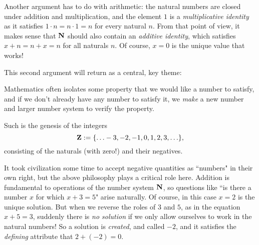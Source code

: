 \documentclass[11pt,oneside]{amsart}
\begin{document}
Another argument has to do with arithmetic: the natural numbers are closed under 
addition and multiplication, and the element $1$ is a 
{\em multiplicative identity} as it satisfies $1\cdot n=n\cdot 1=n$ for every 
natural $n$.  From that point of view, it makes sense that $\mathbf{N}$ should also 
contain an {\em additive identity}, which satisfies $x + n = n + x = n$ for 
all naturals $n$.  Of course, $x=0$ is the unique value that works!

This second argument will return as a central, key theme: 
\begin{philosophy}
	Mathematics often isolates some property that we would like a number to 
  satisfy, and if we don't already have any number to satisfy it, we {\em make} 
  a new number and larger number system to verify the property. 
\end{philosophy}

Such is the genesis of the integers
\[\mathbf{Z}:=\{\ldots -3,-2,-1,0,1,2,3,\ldots\},\]
consisting of the naturals (with zero!) and their negatives.

It took civilization some time to accept negative quantities as ``numbers" in 
their own right, but the above philosophy plays a critical role here.  
Addition is fundamental to operations of the number system $\mathbf{N}$,
so questions like ``is there a number $x$ for which $x+3=5$" arise naturally.  
Of course, in this case $x=2$ is the unique solution.
But when we reverse the roles of $3$ and $5$, as in the equation $x+5=3$, 
suddenly there is {\em no solution} if we only allow ourselves to 
work in the natural numbers!  So a solution is {\em created}, and called $-2$, 
and it satisfies the {\em defining} attribute that $2 + (-2) = 0$.
\end{document}
